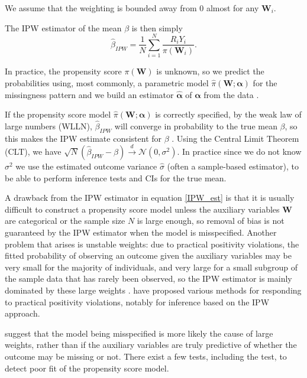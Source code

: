 \documentclass[12pt,twoside]{article}
\begin{document}
We assume that the weighting is bounded away from 0 almost for any $\mathbf{W}_i$.

The IPW estimator of the mean $\beta$ is then simply 
\begin{equation} \label{IPW_est}
    \hat{\beta}_{IPW} = \frac{1}{N} \sum_{i=1}^{N} \frac{R_iY_i}{\pi(\mathbf{W}_i)}.
\end{equation}

In practice, the propensity score $\pi(\mathbf{W})$ is unknown, so we predict the probabilities using, most commonly, a parametric model $\hat\pi(\mathbf{W}; \boldsymbol\alpha)$ for the missingness pattern and we build an estimator $\hat{\boldsymbol\alpha}$ of $\boldsymbol\alpha$ from the data \citep{vansteelandt}.

If the propensity score model $\hat\pi(\mathbf{W}; \boldsymbol\alpha)$ is correctly specified, by the weak law of large numbers (WLLN), $\hat{\beta}_{IPW}$ will converge in probability to the true mean $\beta$, so this makes the IPW estimate consistent for $\beta$ \citep{davidian}. Using the Central Limit Theorem (CLT), we have $\sqrt{N}(\hat{\beta}_{IPW}-\beta) \xrightarrow{d} \mathcal{N}(0,\sigma^2)$. In practice since we do not know $\sigma^2$ we use the estimated outcome variance $\hat\sigma$ (often a sample-based estimator), to be able to perform inference tests and CIs for the true mean.

A drawback from the IPW estimator in equation \ref{IPW_est} is that it is usually difficult to construct a propensity score model unless the auxiliary variables $\mathbf{W}$ are categorical or the sample size $N$ is large enough, so removal of bias is not guaranteed by the IPW estimator when the model is misspecified. Another problem that arises is unstable weights: due to practical positivity violations, the fitted probability of observing an outcome given the auxiliary variables may be very small for the majority of individuals, and very large for a small subgroup of the sample data that has rarely been observed, so the IPW estimator is mainly dominated by these large weights \citep{seaman}. \cite{petersen} have proposed various methods for responding to practical positivity violations, notably for inference based on the IPW approach.

\citet{kang} suggest that the model being misspecified is more likely the cause of large weights, rather than if the auxiliary variables are truly predictive of whether the outcome may be missing or not. There exist a few tests, including the \citet{hosmer} test, to detect poor fit of the propensity score model.\\
\end{document}
